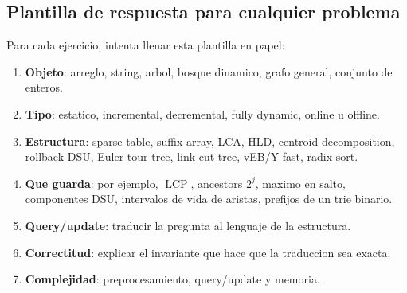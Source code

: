 \documentclass[10pt]{article}
\newcommand{\LCP}{\operatorname{LCP}}
\begin{document}
\subsection{Plantilla de respuesta para cualquier problema}
Para cada ejercicio, intenta llenar esta plantilla en papel:
\begin{enumerate}
\item \textbf{Objeto}: arreglo, string, arbol, bosque dinamico, grafo general, conjunto de enteros.
\item \textbf{Tipo}: estatico, incremental, decremental, fully dynamic, online u offline.
\item \textbf{Estructura}: sparse table, suffix array, LCA, HLD, centroid decomposition, rollback DSU,
Euler-tour tree, link-cut tree, vEB/Y-fast, radix sort.
\item \textbf{Que guarda}: por ejemplo, \(\LCP\), ancestors \(2^j\), maximo en salto, componentes DSU,
intervalos de vida de aristas, prefijos de un trie binario.
\item \textbf{Query/update}: traducir la pregunta al lenguaje de la estructura.
\item \textbf{Correctitud}: explicar el invariante que hace que la traduccion sea exacta.
\item \textbf{Complejidad}: preprocesamiento, query/update y memoria.
\end{enumerate}
\end{document}
